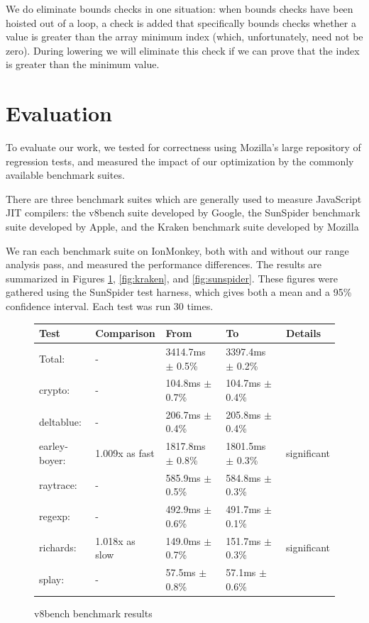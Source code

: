 \documentclass{article}
\begin{document}
We do eliminate bounds checks in one situation: when bounds checks
have been hoisted out of a loop, a check is added that specifically
bounds checks whether a value is greater than the array minimum index
(which, unfortunately, need not be zero). During lowering we will
eliminate this check if we can prove that the index is greater than
the minimum value.

\section{Evaluation}
To evaluate our work, we tested for correctness using Mozilla's large
repository of regression tests, and measured the impact of our
optimization by the commonly available benchmark suites.

There are three benchmark suites which are generally used to measure JavaScript
JIT compilers: the v8bench suite developed by Google\cite{v8bench}, the SunSpider benchmark
suite developed by Apple\cite{sunspider}, and the Kraken benchmark suite developed by Mozilla\cite{kraken}

We ran each benchmark suite on IonMonkey, both with and without our
range analysis pass, and measured the performance differences. The
results are summarized in Figures \ref{fig:v8bench}, \ref{fig:kraken},
and \ref{fig:sunspider}. These figures were gathered using the
SunSpider test harness, which gives both a mean and a 95\% confidence
interval\cite{sunspider}. Each test was run 30 times.
\begin{figure}[H]
\begin{center}
\begin{tabular}{|l|l|l|l|l|}
\hline
    \textbf{Test}     &\textbf{Comparison} & \textbf{From}        & \textbf{To}           &  \textbf{Details} \\
\hline\hline
    Total:            &   -                & 3414.7ms $\pm$ 0.5\% &  3397.4ms $\pm$ 0.2\% & \\
\hline
\hline  crypto:       &   -                &  104.8ms $\pm$ 0.7\% &   104.7ms $\pm$ 0.4\% & \\
\hline  deltablue:    &   -                &  206.7ms $\pm$ 0.4\% &   205.8ms $\pm$ 0.4\% & \\
\hline  earley-boyer: &   1.009x as fast   & 1817.8ms $\pm$ 0.8\% &  1801.5ms $\pm$ 0.3\% &     significant \\
\hline  raytrace:     &   -                &  585.9ms $\pm$ 0.5\% &   584.8ms $\pm$ 0.3\% & \\
\hline  regexp:       &   -                &  492.9ms $\pm$ 0.6\% &   491.7ms $\pm$ 0.1\% & \\
\hline  richards:     &   1.018x as slow   &  149.0ms $\pm$ 0.7\% &   151.7ms $\pm$ 0.3\% &     significant \\
\hline  splay:        &   -                &   57.5ms $\pm$ 0.8\% &    57.1ms $\pm$ 0.6\% & \\
\hline
\end{tabular}
\caption{v8bench benchmark results}
\label{fig:v8bench}
\end{center}
\end{figure}
\end{document}
